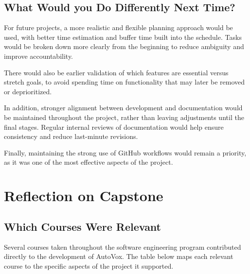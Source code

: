\documentclass[12pt, titlepage]{article}
\begin{document}
\subsection{What Would you Do Differently Next Time?}

For future projects, a more realistic and flexible planning approach would be used, with better time estimation and buffer time built into the schedule. Tasks would be broken down more clearly from the beginning to reduce ambiguity and improve accountability.

There would also be earlier validation of which features are essential versus stretch goals, to avoid spending time on functionality that may later be removed or deprioritized.

In addition, stronger alignment between development and documentation would be maintained throughout the project, rather than leaving adjustments until the final stages. Regular internal reviews of documentation would help ensure consistency and reduce last-minute revisions.

Finally, maintaining the strong use of GitHub workflows would remain a priority, as it was one of the most effective aspects of the project.

\section{Reflection on Capstone}


\subsection{Which Courses Were Relevant}

Several courses taken throughout the software engineering program contributed directly to the development of AutoVox.
The table below maps each relevant course to the specific aspects of the project it supported.
\end{document}

